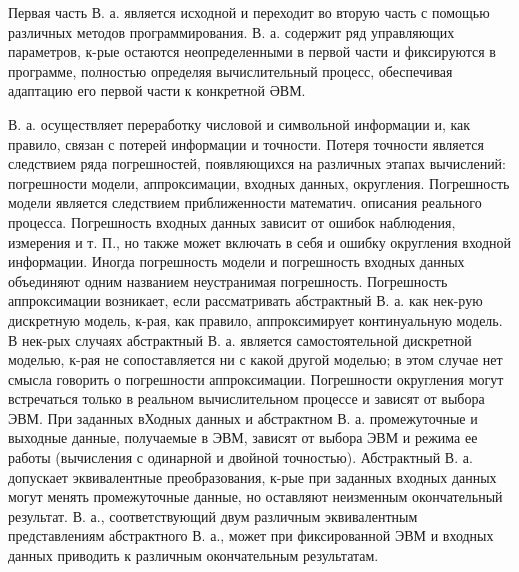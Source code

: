 \documentclass[10pt]{article}
\begin{document}
Первая часть В. а. является исходной и переходит во вторую часть с помощью различных методов программирования. В. а. содержит ряд управляющих параметров, к-рые остаются неопределенными в первой части и фиксируются в программе, полностью определяя вычислительный процесс, обеспечивая адаптацию его первой части к конкретной ӘВМ.



В. а. осуществляет переработку числовой и символьной информации и, как правило, связан с потерей информации и точности. Потеря точности является следствием ряда погрешностей, появляющихся на различных этапах вычислений: погрешности модели, аппроксимации, входных данных, округления. Погрешность модели является следствием приближенности математич. описания реального процесса. Погрешность входных данных зависит от ошибок наблюдения, измерения и т. П., но также может включать в себя и ошибку округления входной информации. Иногда погрешность модели и погрешность входных данных объединяют одним названием неустранимая погрешность. Погрешность аппроксимации возникает, если рассматривать абстрактный В. а. как нек-рую дискретную модель, к-рая, как правило, аппроксимирует континуальную модель. В нек-рых случаях абстрактный В. а. является самостоятельной дискретной моделью, к-рая не сопоставляется ни с какой другой моделью; в этом случае нет смысла говорить о погрешности аппроксимации. Погрешности округления могут встречаться только в реальном вычислительном процессе и зависят от выбора ЭВМ. При заданных вХодных данных и абстрактном В. а. промежуточные и выходные данные, получаемые в ЭВМ, зависят от выбора ЭВМ и режима ее работы (вычисления с одинарной и двойной точностью). Абстрактный В. а. допускает эквивалентные преобразования, к-рые при заданных входных данных могут менять промежуточные данные, но оставляют неизменным окончательный результат. В. а., соответствующий двум различным эквивалентным представлениям абстрактного В. а., может при фиксированной ЭВМ и входных данных приводить к различным окончательным результатам.
\end{document}
